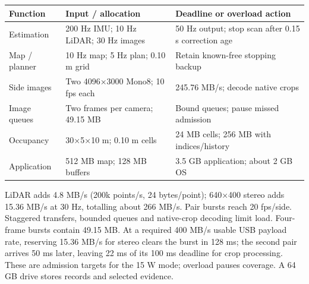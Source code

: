 \documentclass[a4paper,11pt]{article}
\begin{document}
\par\addvspace{8pt}\noindent\begin{minipage}{\linewidth}\centering
{}\label{tab:5}
\begin{tabular}{C{0.290\dimexpr\linewidth-24pt\relax}C{0.290\dimexpr\linewidth-24pt\relax}C{0.420\dimexpr\linewidth-24pt\relax}}
\toprule
\textbf{Function} & \textbf{Input / allocation} & \textbf{Deadline or overload action}\\\midrule
Estimation & 200 Hz IMU; 10 Hz LiDAR; 30 Hz images & 50 Hz output; stop scan after 0.15 s correction age\\
Map / planner & 10 Hz map; 5 Hz plan; 0.10 m grid & Retain known-free stopping backup\\
Side images & Two 4096×3000 Mono8; 10 fps each & 245.76 MB/s; decode native crops\\
Image queues & Two frames per camera; 49.15 MB & Bound queues; pause missed admission\\
Occupancy & 30×5×10 m; 0.10 m cells & 24 MB cells; 256 MB with indices/history\\
Application & 512 MB map; 128 MB buffers & 3.5 GB application; about 2 GB OS\\
\bottomrule\end{tabular}\end{minipage}\par\addvspace{8pt}
LiDAR adds 4.8 MB/s (200k points/s, 24 bytes/point); 640×400 stereo adds 15.36 MB/s at 30 Hz, totalling about 266 MB/s. Pair bursts reach 20 fps/side. Staggered transfers, bounded queues and native-crop decoding limit load. Four-frame bursts contain 49.15 MB. At a required 400 MB/s usable USB payload rate, reserving 15.36 MB/s for stereo clears the burst in 128 ms; the second pair arrives 50 ms later, leaving 22 ms of its 100 ms deadline for crop processing. These are admission targets for the 15 W mode; overload pauses coverage. A 64 GB drive stores records and selected evidence.
\end{document}
